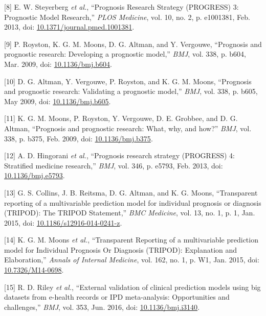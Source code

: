 \documentclass[12pt,PhD,twoside,openright]{muthesis}
\newenvironment{cslreferences}%
  {}%
  {\par}
\begin{document}
\begin{cslreferences}
\leavevmode\hypertarget{ref-steyerberg_prognosis_2013}{}%
{[}8{]} E. W. Steyerberg \emph{et al.}, ``Prognosis Research Strategy (PROGRESS) 3: Prognostic Model Research,'' \emph{PLOS Medicine}, vol. 10, no. 2, p. e1001381, Feb. 2013, doi: \href{https://doi.org/10.1371/journal.pmed.1001381}{10.1371/journal.pmed.1001381}.

\leavevmode\hypertarget{ref-royston_prognosis_2009}{}%
{[}9{]} P. Royston, K. G. M. Moons, D. G. Altman, and Y. Vergouwe, ``Prognosis and prognostic research: Developing a prognostic model,'' \emph{BMJ}, vol. 338, p. b604, Mar. 2009, doi: \href{https://doi.org/10.1136/bmj.b604}{10.1136/bmj.b604}.

\leavevmode\hypertarget{ref-altman_prognosis_2009}{}%
{[}10{]} D. G. Altman, Y. Vergouwe, P. Royston, and K. G. M. Moons, ``Prognosis and prognostic research: Validating a prognostic model,'' \emph{BMJ}, vol. 338, p. b605, May 2009, doi: \href{https://doi.org/10.1136/bmj.b605}{10.1136/bmj.b605}.

\leavevmode\hypertarget{ref-moons_prognosis_2009}{}%
{[}11{]} K. G. M. Moons, P. Royston, Y. Vergouwe, D. E. Grobbee, and D. G. Altman, ``Prognosis and prognostic research: What, why, and how?'' \emph{BMJ}, vol. 338, p. b375, Feb. 2009, doi: \href{https://doi.org/10.1136/bmj.b375}{10.1136/bmj.b375}.

\leavevmode\hypertarget{ref-hingorani_prognosis_2013}{}%
{[}12{]} A. D. Hingorani \emph{et al.}, ``Prognosis research strategy (PROGRESS) 4: Stratified medicine research,'' \emph{BMJ}, vol. 346, p. e5793, Feb. 2013, doi: \href{https://doi.org/10.1136/bmj.e5793}{10.1136/bmj.e5793}.

\leavevmode\hypertarget{ref-collins_transparent_2015}{}%
{[}13{]} G. S. Collins, J. B. Reitsma, D. G. Altman, and K. G. Moons, ``Transparent reporting of a multivariable prediction model for individual prognosis or diagnosis (TRIPOD): The TRIPOD Statement,'' \emph{BMC Medicine}, vol. 13, no. 1, p. 1, Jan. 2015, doi: \href{https://doi.org/10.1186/s12916-014-0241-z}{10.1186/s12916-014-0241-z}.

\leavevmode\hypertarget{ref-moons_transparent_2015}{}%
{[}14{]} K. G. M. Moons \emph{et al.}, ``Transparent Reporting of a multivariable prediction model for Individual Prognosis Or Diagnosis (TRIPOD): Explanation and Elaboration,'' \emph{Annals of Internal Medicine}, vol. 162, no. 1, p. W1, Jan. 2015, doi: \href{https://doi.org/10.7326/M14-0698}{10.7326/M14-0698}.

\leavevmode\hypertarget{ref-riley_external_2016}{}%
{[}15{]} R. D. Riley \emph{et al.}, ``External validation of clinical prediction models using big datasets from e-health records or IPD meta-analysis: Opportunities and challenges,'' \emph{BMJ}, vol. 353, Jun. 2016, doi: \href{https://doi.org/10.1136/bmj.i3140}{10.1136/bmj.i3140}.


\end{cslreferences}
\end{document}
